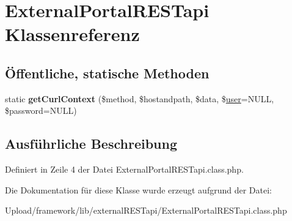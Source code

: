 \hypertarget{class_external_portal_r_e_s_tapi}{}\section{External\+Portal\+R\+E\+S\+Tapi Klassenreferenz}
\label{class_external_portal_r_e_s_tapi}
\subsection*{Öffentliche, statische Methoden}
\begin{DoxyCompactItemize}
\item 
\mbox{\label{class_external_portal_r_e_s_tapi_ae2568bd0b9b51cb5add7a83b2003ab1e}} 
static {\bfseries get\+Curl\+Context} (\$method, \$hostandpath, \$data, \$\mbox{\hyperlink{classuser}{user}}=N\+U\+LL, \$password=N\+U\+LL)
\end{DoxyCompactItemize}


\subsection{Ausführliche Beschreibung}


Definiert in Zeile 4 der Datei External\+Portal\+R\+E\+S\+Tapi.\+class.\+php.



Die Dokumentation für diese Klasse wurde erzeugt aufgrund der Datei\+:\begin{DoxyCompactItemize}
\item 
Upload/framework/lib/external\+R\+E\+S\+Tapi/External\+Portal\+R\+E\+S\+Tapi.\+class.\+php\end{DoxyCompactItemize}
